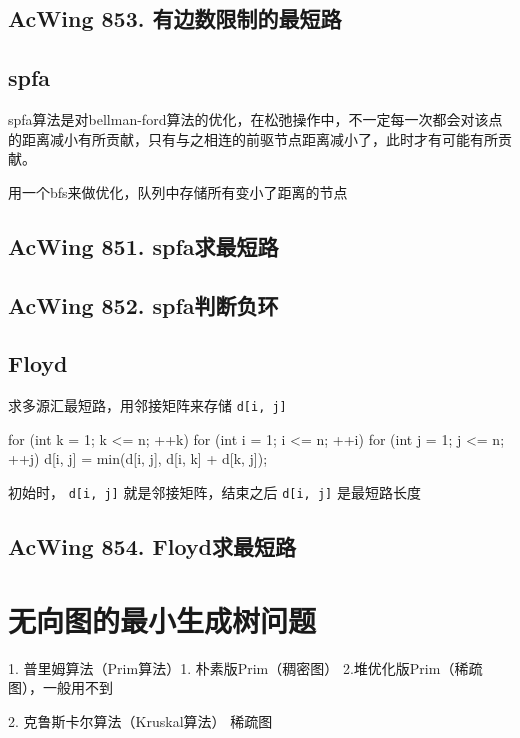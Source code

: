 \subsection{AcWing 853. 有边数限制的最短路}

\subsection{spfa}
spfa算法是对bellman-ford算法的优化，在松弛操作中，不一定每一次都会对该点的距离减小有所贡献，只有与之相连的前驱节点距离减小了，此时才有可能有所贡献。

用一个bfs来做优化，队列中存储所有变小了距离的节点

\subsection{AcWing 851. spfa求最短路}
\subsection{AcWing 852. spfa判断负环}

\subsection{Floyd}
求多源汇最短路，用邻接矩阵来存储 \lstinline{d[i, j]}

\begin{mycpponecol}[Floyd算法]
for (int k = 1; k <= n; ++k) {
    for (int i = 1; i <= n; ++i) {
        for (int j = 1; j <= n; ++j) {
            d[i, j] = min(d[i, j], d[i, k] + d[k, j]);
        }
    }
}
\end{mycpponecol}

初始时， \lstinline{d[i, j]} 就是邻接矩阵，结束之后 \lstinline{d[i, j]} 是最短路长度

\subsection{AcWing 854. Floyd求最短路}

\section{无向图的最小生成树问题}

1. 普里姆算法（Prim算法）1. 朴素版Prim（稠密图） 2.堆优化版Prim（稀疏图），一般用不到

2. 克鲁斯卡尔算法（Kruskal算法） 稀疏图

